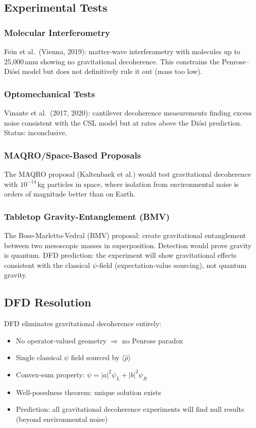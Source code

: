 \documentclass[11pt,letterpaper]{article}
\begin{document}
\subsection{Experimental Tests}

\subsubsection{Molecular Interferometry}

Fein et al.\ (Vienna, 2019): matter-wave interferometry with molecules
up to 25,000\,amu showing no gravitational decoherence. This constrains
the Penrose--Di\'osi model but does not definitively rule it out (mass
too low).

\subsubsection{Optomechanical Tests}

Vinante et al.\ (2017, 2020): cantilever decoherence measurements
finding excess noise consistent with the CSL model but at rates above
the Di\'osi prediction. Status: inconclusive.

\subsubsection{MAQRO/Space-Based Proposals}

The MAQRO proposal (Kaltenbaek et al.) would test gravitational
decoherence with $10^{-14}$\,kg particles in space, where isolation from
environmental noise is orders of magnitude better than on Earth.

\subsubsection{Tabletop Gravity-Entanglement (BMV)}

The Bose-Marletto-Vedral (BMV) proposal: create gravitational
entanglement between two mesoscopic masses in superposition. Detection
would prove gravity is quantum. DFD prediction: the experiment will show
gravitational effects consistent with the classical $\psi$-field
(expectation-value sourcing), not quantum gravity.

\subsection{DFD Resolution}

DFD eliminates gravitational decoherence entirely:
\begin{itemize}
\item No operator-valued geometry $\Rightarrow$ no Penrose paradox
\item Single classical $\psi$ field sourced by $\langle\hat{\rho}\rangle$
\item Convex-sum property: $\psi = |a|^2\psi_L + |b|^2\psi_R$
\item Well-posedness theorem: unique solution exists
\item Prediction: all gravitational decoherence experiments will find
null results (beyond environmental noise)
\end{itemize}
\end{document}
